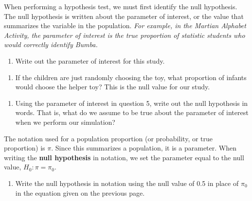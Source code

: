 \documentclass[
]{report}
\providecommand{\tightlist}{%
  \setlength{\itemsep}{0pt}\setlength{\parskip}{0pt}}
\begin{document}
When performing a hypothesis test, we must first identify the null hypothesis. The null hypothesis is written about the parameter of interest, or the value that summarizes the variable in the population. \emph{For example, in the Martian Alphabet Activity, the parameter of interest is the true proportion of statistic students who would correctly identify Bumba.}

\begin{enumerate}
\def\labelenumi{\arabic{enumi}.}
\setcounter{enumi}{4}
\tightlist
\item
  Write out the parameter of interest for this study.
\end{enumerate}

\vspace{0.8in}

\begin{enumerate}
\def\labelenumi{\arabic{enumi}.}
\setcounter{enumi}{5}
\tightlist
\item
  If the children are just randomly choosing the toy, what proportion of infants would choose the helper toy? This is the null value for our study.
\end{enumerate}

\vspace{0.3in}

\begin{enumerate}
\def\labelenumi{\arabic{enumi}.}
\setcounter{enumi}{6}
\tightlist
\item
  Using the parameter of interest in question 5, write out the null hypothesis in words. That is, what do we assume to be true about the parameter of interest when we perform our simulation?
\end{enumerate}

\vspace{0.8in}

The notation used for a population proportion (or probability, or true proportion) is \(\pi\). Since this summarizes a population, it is a parameter. When writing the \textbf{null hypothesis} in notation, we set the parameter equal to the null value, \(H_0: \pi = \pi_0\).

\begin{enumerate}
\def\labelenumi{\arabic{enumi}.}
\setcounter{enumi}{7}
\tightlist
\item
  Write the null hypothesis in notation using the null value of 0.5 in place of \(\pi_0\) in the equation given on the previous page.
\end{enumerate}
\end{document}
